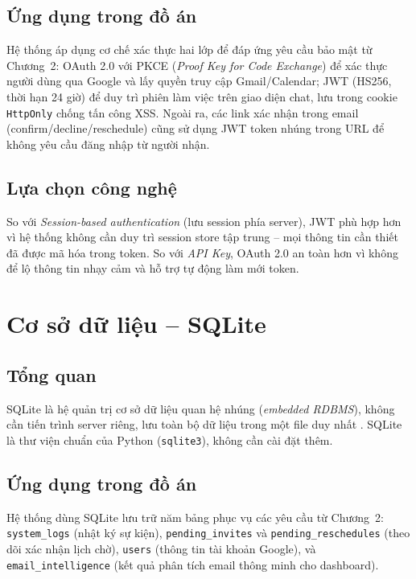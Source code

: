 \documentclass[../DoAn.tex]{subfiles}
\begin{document}
\subsection{Ứng dụng trong đồ án}

Hệ thống áp dụng cơ chế xác thực hai lớp để đáp ứng yêu cầu bảo mật từ Chương~2: OAuth 2.0 với PKCE (\textit{Proof Key for Code Exchange}) để xác thực người dùng qua Google và lấy quyền truy cập Gmail/Calendar; JWT (HS256, thời hạn 24 giờ) để duy trì phiên làm việc trên giao diện chat, lưu trong cookie \texttt{HttpOnly} chống tấn công XSS. Ngoài ra, các link xác nhận trong email (confirm/decline/reschedule) cũng sử dụng JWT token nhúng trong URL để không yêu cầu đăng nhập từ người nhận.

\subsection{Lựa chọn công nghệ}

So với \textit{Session-based authentication} (lưu session phía server), JWT phù hợp hơn vì hệ thống không cần duy trì session store tập trung -- mọi thông tin cần thiết đã được mã hóa trong token. So với \textit{API Key}, OAuth 2.0 an toàn hơn vì không để lộ thông tin nhạy cảm và hỗ trợ tự động làm mới token.

\section{Cơ sở dữ liệu -- SQLite}

\subsection{Tổng quan}

SQLite là hệ quản trị cơ sở dữ liệu quan hệ nhúng (\textit{embedded RDBMS}), không cần tiến trình server riêng, lưu toàn bộ dữ liệu trong một file duy nhất \cite{hipp2024sqlite}. SQLite là thư viện chuẩn của Python (\texttt{sqlite3}), không cần cài đặt thêm.

\subsection{Ứng dụng trong đồ án}

Hệ thống dùng SQLite lưu trữ năm bảng phục vụ các yêu cầu từ Chương~2: \texttt{system\_logs} (nhật ký sự kiện), \texttt{pending\_invites} và \texttt{pending\_reschedules} (theo dõi xác nhận lịch chờ), \texttt{users} (thông tin tài khoản Google), và \texttt{email\_intelligence} (kết quả phân tích email thông minh cho dashboard).
\end{document}
